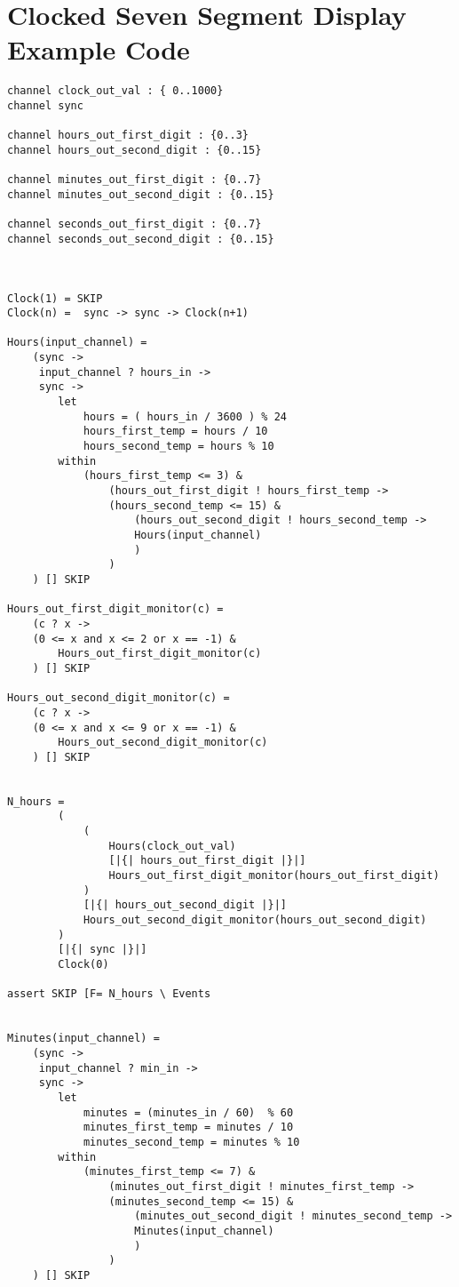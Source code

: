 \section*{Clocked Seven Segment Display Example \cspm{} Code}
\begin{verbatim}
channel clock_out_val : { 0..1000}
channel sync

channel hours_out_first_digit : {0..3}
channel hours_out_second_digit : {0..15}

channel minutes_out_first_digit : {0..7}
channel minutes_out_second_digit : {0..15}

channel seconds_out_first_digit : {0..7}
channel seconds_out_second_digit : {0..15}



Clock(1) = SKIP
Clock(n) =  sync -> sync -> Clock(n+1)

Hours(input_channel) =
    (sync ->
     input_channel ? hours_in ->
     sync ->
        let
            hours = ( hours_in / 3600 ) % 24
            hours_first_temp = hours / 10
            hours_second_temp = hours % 10
        within
            (hours_first_temp <= 3) &
                (hours_out_first_digit ! hours_first_temp ->
                (hours_second_temp <= 15) &
                    (hours_out_second_digit ! hours_second_temp ->
                    Hours(input_channel)
                    )
                )
    ) [] SKIP

Hours_out_first_digit_monitor(c) =
    (c ? x ->
    (0 <= x and x <= 2 or x == -1) &
        Hours_out_first_digit_monitor(c)
    ) [] SKIP

Hours_out_second_digit_monitor(c) =
    (c ? x ->
    (0 <= x and x <= 9 or x == -1) &
        Hours_out_second_digit_monitor(c)
    ) [] SKIP


N_hours =
        (
            (
                Hours(clock_out_val)
                [|{| hours_out_first_digit |}|]
                Hours_out_first_digit_monitor(hours_out_first_digit)
            )
            [|{| hours_out_second_digit |}|]
            Hours_out_second_digit_monitor(hours_out_second_digit)
        )
        [|{| sync |}|]
        Clock(0)

assert SKIP [F= N_hours \ Events


Minutes(input_channel) =
    (sync ->
     input_channel ? min_in ->
     sync ->
        let
            minutes = (minutes_in / 60)  % 60
            minutes_first_temp = minutes / 10
            minutes_second_temp = minutes % 10
        within
            (minutes_first_temp <= 7) &
                (minutes_out_first_digit ! minutes_first_temp ->
                (minutes_second_temp <= 15) &
                    (minutes_out_second_digit ! minutes_second_temp ->
                    Minutes(input_channel)
                    )
                )
    ) [] SKIP


\end{verbatim}
